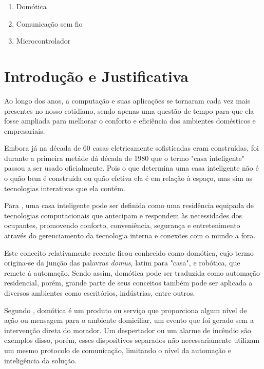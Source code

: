 \documentclass[
    12pt,               %
    a4paper,            %
    english,            %
    brazil,             %
    ]{article}
\begin{document}
        \begin{enumerate}
            \item Domótica
            \item Comunicação sem fio
            \item Microcontrolador
        \end{enumerate}


\section{Introdução e Justificativa}
Ao longo dos anos, a computação e suas aplicações se tornaram cada vez mais presentes no nosso cotidiano, sendo apenas
uma questão de tempo para que ela fosse ampliada para melhorar o conforto e eficiência dos ambientes domésticos e empresariais.

Embora já na década de 60 casas eletricamente sofisticadas eram construídas, foi durante a primeira metáde dá década de 1980
que o termo "casa inteligente" passou a ser usado oficialmente. Pois o que determina uma casa inteligente não é o quão bem é construída
ou quão efetiva ela é em relação à espaço, mas sim as tecnologias interativas que ela contém.\cite{harper2003}

Para , uma casa inteligente pode ser definida como uma residência equipada de tecnologias computacionais que antecipam e
respondem às necessidades dos ocupantes, promovendo conforto, conveniência, segurança e entretenimento através do gerenciamento da tecnologia interna
e conexões com o mundo a fora.

Este conceito relativamente recente ficou conhecido como domótica, cujo termo origina-se da junção das palavras \textit{domus}, latim para "casa",
e robótica, que remete à automação. Sendo assim, domótica pode ser traduzida como automação residencial, porém, grande parte de seus conceitos também pode ser aplicada
a diversos ambientes como escritórios, indústrias, entre outros.

Segundo , domótica é um produto ou serviço que proporciona algum nível de ação ou mensagem para o ambiente domiciliar,
um evento que foi gerado sem a intervenção direta do morador. Um despertador ou um alarme de incêndio são exemplos disso, porém, esses dispositivos separados não necessariamente utilizam
um mesmo protocolo de comunicação, limitando o nível da automação e inteligência da solução.
\end{document}
